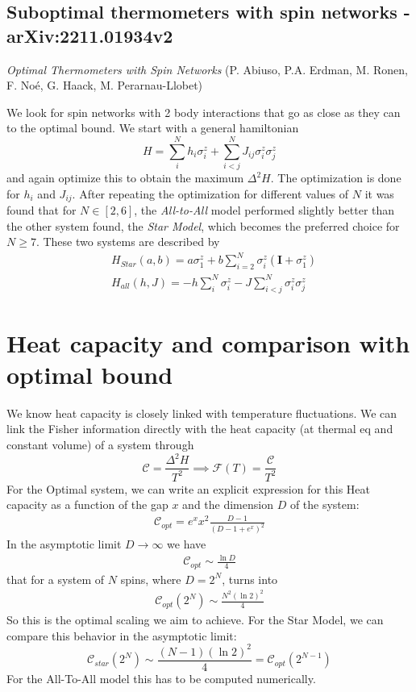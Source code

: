 \documentclass{article}
\begin{document}
\subsection{Suboptimal thermometers with spin networks - arXiv:2211.01934v2}
\small{\textit{Optimal Thermometers with Spin Networks} (P. Abiuso, P.A. Erdman, M. Ronen, F. Noé, G. Haack, M. Perarnau-Llobet)}

\vspace{0.7 cm}
We look for spin networks with 2 body interactions that go as close as they can to the optimal bound. We start with a general hamiltonian 
\begin{equation}
    H = \sum_i^Nh_i\sigma_i^z + \sum_{i<j}^N J_{ij}\sigma_i^z\sigma_j^z
\end{equation}
and again optimize this to obtain the maximum $\Delta^2H$. The optimization is done for $h_i$ and $J_{ij}$. After repeating the optimization for different values of $N$ it was found that for $N \in [2,6]$, the \textit{All-to-All} model performed slightly better than the other system found, the \textit{Star Model}, which becomes the preferred choice for $N \geq 7$. These two systems are described by
\begin{align}
    &H_{Star}(a,b)=a\sigma_1^z + b\sum_{i=2}^{N}\sigma_i^z(\mathbf{I}+\sigma_1^z)
    \label{Hstar}\\
    &H_{all}(h,J)=-h\sum_i^N\sigma_i^z-J\sum_{i<j}^N\sigma_i^z \sigma_j^z
    \label{H_all}
\end{align}

\section{Heat capacity and comparison with optimal bound}
We know heat capacity is closely linked with temperature fluctuations. We can link the Fisher information directly with the heat capacity (at thermal eq and constant volume) of a system through
\begin{equation}
    \mathcal{C}=\frac{\Delta^2H}{T^2}\implies\mathcal{F}(T)=\frac{\mathcal{C}}{T^2}
\end{equation}
For the Optimal system, we can write an explicit expression for this Heat capacity as a function of the gap $x$ and the dimension $D$ of the system:
\begin{align}
    \mathcal{C}_{opt}=e^xx^2\frac{D-1}{(D-1+e^x)^2}
\end{align}
In the asymptotic limit $D\to\infty$ we have
\begin{align}
    \mathcal{C}_{opt}\sim \frac{\ln{D}}{4}
\end{align}
that for a system of $N$ spins, where $D=2^N$, turns into
\begin{align}
    \mathcal{C}_{opt}(2^N)\sim \frac{N^2(\ln2)^2}{4}
\end{align}
So this is the optimal scaling we aim to achieve. For the Star Model, we can compare this behavior in the asymptotic limit:
\begin{equation}
    \mathcal{C}_{star}(2^N)\sim\frac{(N-1)(\ln2)^2}{4}=\mathcal{C}_{opt}(2^{N-1})
\end{equation}
For the All-To-All model this has to be computed numerically.
\end{document}
